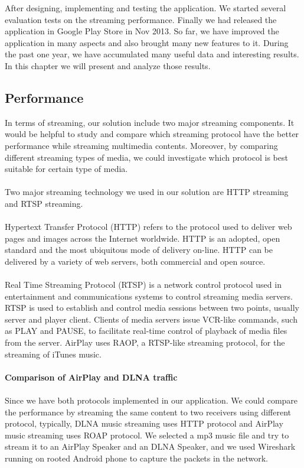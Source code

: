 
After designing, implementing and testing the application. We started several evaluation tests on the streaming performance. Finally we had released the application in Google Play Store in Nov 2013. So far, we have improved the application in many aspects and also brought many new features to it. During the past one year, we have accumulated many useful data and interesting results. In this chapter we will present and analyze those results.

\subsection{Performance}
In terms of streaming, our solution include two major streaming components. It would be helpful to study and compare which streaming protocol have the better performance while streaming multimedia contents. Moreover, by comparing different streaming types of media, we could investigate which protocol is best suitable for certain type of media. \\
\\Two major streaming technology we used in our solution are HTTP streaming and RTSP streaming.\\
\\
Hypertext Transfer Protocol (HTTP) refers to the protocol used to deliver web pages and images across the Internet worldwide. HTTP is an adopted, open standard and the most ubiquitous mode of delivery on-line. HTTP can be delivered by a variety of web servers, both commercial and open source.\\
\\
Real Time Streaming Protocol (RTSP) is a network control protocol used in entertainment and communications systems to control streaming media servers. RTSP is used to establish and control media sessions between two points, usually server and player client. Clients of media servers issue VCR-like commands, such as PLAY and PAUSE, to facilitate real-time control of playback of media files from the server. AirPlay uses RAOP, a RTSP-like streaming protocol, for the streaming of iTunes music. \\
\\
\textbf{Comparison of AirPlay and DLNA traffic}\\
\\
Since we have both protocols implemented in our application. We could compare the performance by streaming the same content to two receivers using different protocol, typically, DLNA music streaming uses HTTP protocol and AirPlay music streaming uses ROAP protocol. We selected a mp3 music file and try to stream it to an AirPlay Speaker and an DLNA Speaker, and we used Wireshark running on rooted Android phone to capture the packets in the network.\\
